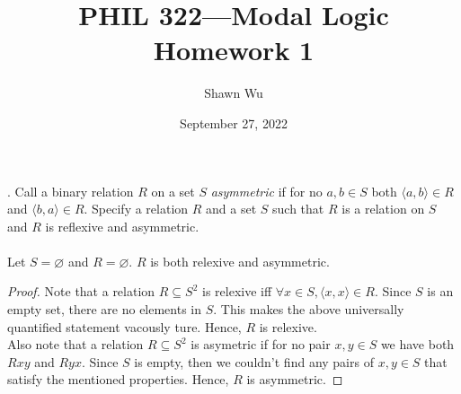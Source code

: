 \documentclass[12pt]{article}
\title{PHIL 322---Modal Logic \\Homework 1}
\author{Shawn Wu}
\date{September 27, 2022}
\begin{document}
\maketitle
. Call a binary relation $R$ on a set $S$ \emph{asymmetric} if for no $a,b \in S$ 
both $\langle a, b \rangle \in R$ and $\langle b, a \rangle \in R$. Specify a 
relation $R$ and a set $S$ such that $R$ is a relation on $S$ and $R$ is reflexive 
and asymmetric. \\
\\
Let $S = \varnothing$ and $R = \varnothing$. $R$ is both relexive and asymmetric.\\

\begin{proof}
Note that a relation $R \subseteq S^2$ is relexive iff $\forall x \in S, \langle x ,x \rangle \in R.$ 
Since $S$ is an empty set, there are no elements in $S$. This makes the above universally quantified statement vacously ture.
Hence, $R$ is relexive.
\\
Also note that a relation $R \subseteq S^2$ is asymetric if for no pair $x,y \in S$ we have both $Rxy$ and $Ryx.$
Since $S$ is empty, then we couldn't find any pairs of $x,y \in S$ that satisfy the mentioned properties.
Hence, $R$ is asymmetric. 
\end{proof}
\end{document}

